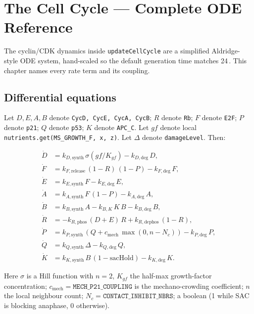 \documentclass[11pt,letterpaper,twoside,openany]{book}
\newcommand{\code}[1]{\texttt{#1}}
\newcommand{\bioh}{\text{bio-h}}
\begin{document}
\chapter{The Cell Cycle --- Complete ODE Reference}
\label{ch:cycle-deep}

The cyclin/CDK dynamics inside \code{updateCellCycle} are a
simplified Aldridge-style ODE system, hand-scaled so the
default generation time matches 24\,\bioh. This chapter names every
rate term and its coupling.

\section{Differential equations}

Let $D, E, A, B$ denote \code{CycD, CycE, CycA, CycB}; $R$ denote
\code{Rb}; $F$ denote \code{E2F}; $P$ denote \code{p21}; $Q$ denote
\code{p53}; $K$ denote \code{APC\_C}. Let $gf$ denote local
\code{nutrients.get(MS\_GROWTH\_F, x, z)}. Let $\Delta$ denote
\code{damageLevel}. Then:

\begin{align}
  \dot D &= k_{D,\text{synth}}\, \sigma(gf / K_{gf}) - k_{D,\text{deg}}\,D,
           \label{eq:cycD}\\
  \dot F &= k_{F,\text{release}}\,(1-R)\,(1-P) - k_{F,\text{deg}}\,F,
           \label{eq:E2F}\\
  \dot E &= k_{E,\text{synth}}\,F - k_{E,\text{deg}}\,E,
           \label{eq:cycE}\\
  \dot A &= k_{A,\text{synth}}\,F\,(1-P) - k_{A,\text{deg}}\,A,
           \label{eq:cycA}\\
  \dot B &= k_{B,\text{synth}}\,A - k_{B,K}\,K\,B - k_{B,\text{deg}}\,B,
           \label{eq:cycB}\\
  \dot R &= -k_{R,\text{phos}}\,(D + E)\,R + k_{R,\text{dephos}}\,(1-R),
           \label{eq:Rb}\\
  \dot P &= k_{P,\text{synth}}\,(Q + c_{\text{mech}}\,\max(0, n-N_c)) - k_{P,\text{deg}}\,P,
           \label{eq:p21}\\
  \dot Q &= k_{Q,\text{synth}}\,\Delta - k_{Q,\text{deg}}\,Q,
           \label{eq:p53}\\
  \dot K &= k_{K,\text{synth}}\,B\,(1-\text{sacHold}) - k_{K,\text{deg}}\,K.
           \label{eq:APC}
\end{align}

Here $\sigma$ is a Hill function with $n=2$, $K_{gf}$ the half-max
growth-factor concentration; $c_{\text{mech}} = \code{MECH\_P21\_COUPLING}$
is the mechano-crowding coefficient; $n$ the local neighbour count;
$N_c = \code{CONTACT\_INHIBIT\_NBRS}$;  a boolean
(1 while SAC is blocking anaphase, 0 otherwise).
\end{document}
